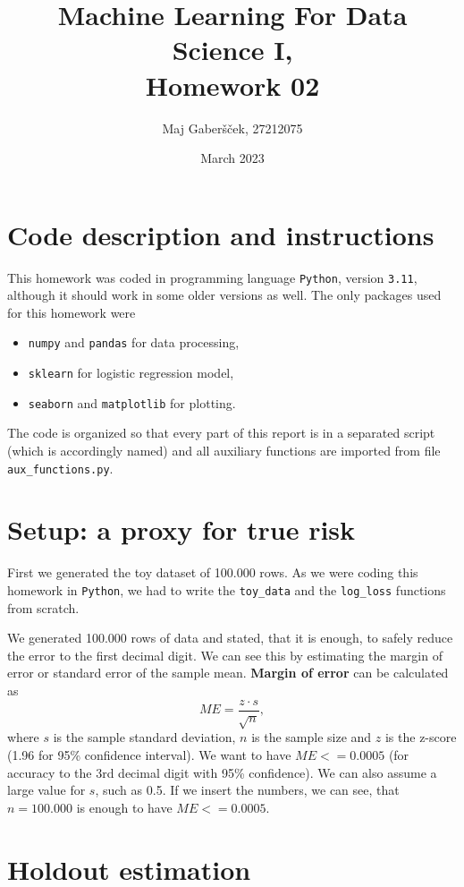 \documentclass{article}
\title{Machine Learning For Data Science I, \\[0.1cm] Homework 02}
\author{Maj Gaberšček, 27212075}
\date{March 2023}
\begin{document}
\maketitle

\section*{Code description and instructions}
This homework was coded in programming language \texttt{Python}, version \texttt{3.11}, although it should work in some older versions as well. The only packages used for this homework were 
\begin{itemize}
    \item \texttt{numpy} and \texttt{pandas} for data processing, 
    \item \texttt{sklearn} for logistic regression model,
    \item \texttt{seaborn} and \texttt{matplotlib} for plotting.
\end{itemize}

The code is organized so that every part of this report is in a separated script (which is accordingly named) and all auxiliary functions are imported from file \texttt{aux\_functions.py}.


\section{Setup: a proxy for true risk}

First we generated the toy dataset of 100.000 rows. As we were coding this homework in \texttt{Python}, we had to write the \texttt{toy\_data} and the \texttt{log\_loss} functions from scratch. 


We generated 100.000 rows of data and stated, that it is enough, to safely reduce the error to the first decimal digit. We can see this by estimating the margin of error or standard error of the sample mean. \textbf{Margin of error} can be calculated as 
$$ME = \frac{z \cdot s}{\sqrt{n}},$$
where $s$ is the sample standard deviation, $n$ is the sample size and $z$ is the z-score (1.96 for 95\% confidence interval).
We want to have $ME <= 0.0005$ (for accuracy to the 3rd decimal digit with 95\% confidence). We can also assume a large value for $s$, such as 0.5. If we insert the numbers, we can see, that $n=100.000$ is enough to have $ME <= 0.0005$.


\section{Holdout estimation}
\end{document}
